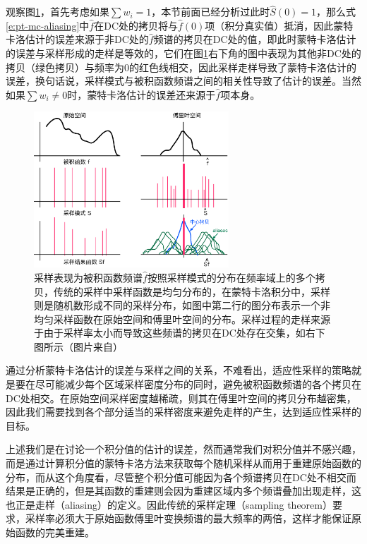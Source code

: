 \noindent 观察图\ref{f:pt-sampling}，首先考虑如果$\sum w_i=1$，本节前面已经分析过此时$\hat{S}(0)=1$，那么式\ref{e:pt-mc-aliasing}中$\hat{f}$在DC处的拷贝将与$\hat{f}(0)$项（积分真实值）抵消，因此蒙特卡洛估计的误差来源于非DC处的$\hat{f}$频谱的拷贝在DC处的值，即此时蒙特卡洛估计的误差与采样形成的走样是等效的，它们在图\ref{f:pt-sampling}右下角的图中表现为其他非DC处的拷贝（绿色拷贝）与频率为0的红色线相交，因此采样走样导致了蒙特卡洛估计的误差，换句话说，采样模式与被积函数频谱之间的相关性导致了估计的误差。当然如果$\sum w_i\neq 0$时，蒙特卡洛估计的误差还来源于$\hat{f}$项本身。

\begin{figure}
	\sidecaption
	\includegraphics[width=0.65\textwidth]{figures/pt/sampling}
	\caption{采样表现为被积函数频谱$\hat{f}$按照采样模式的分布在频率域上的多个拷贝，传统的采样中采样函数是均匀分布的，在蒙特卡洛积分中，采样则是随机数形成不同的采样分布，如图中第二行的图分布表示一个非均匀采样函数在原始空间和傅里叶空间的分布。采样过程的走样来源于由于采样率太小而导致这些频谱的拷贝在DC处存在交集，如右下图所示（图片来自\cite{a:AFrequencyAnalysisofMonteCarloandotherNumericalIntegrationSchemes}）}
	\label{f:pt-sampling}
\end{figure}

通过分析蒙特卡洛估计的误差与采样之间的关系，不难看出，适应性采样的策略就是要在尽可能减少每个区域采样密度分布的同时，避免被积函数频谱的各个拷贝在DC处相交。在原始空间采样密度越稀疏，则其在傅里叶空间的拷贝分布越密集，因此我们需要找到各个部分适当的采样密度来避免走样的产生，达到适应性采样的目标。

上述我们是在讨论一个积分值的估计的误差，然而通常我们对积分值并不感兴趣，而是通过计算积分值的蒙特卡洛方法来获取每个随机采样从而用于重建原始函数的分布，而从这个角度看，尽管整个积分值可能因为各个频谱拷贝在DC处不相交而结果是正确的，但是其函数的重建则会因为重建区域内多个频谱叠加出现走样，这也正是走样（aliasing）的定义。因此传统的采样定理（sampling theorem）要求，采样率必须大于原始函数傅里叶变换频谱的最大频率的两倍，这样才能保证原始函数的完美重建。

